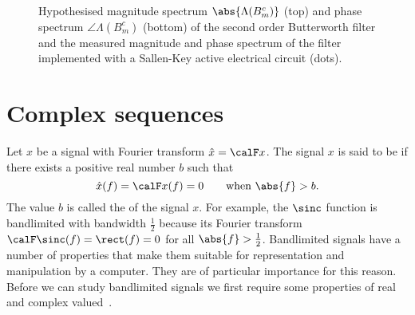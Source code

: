 \begin{figure}[p]
\centering
\begin{shaded}

\caption{Hypothesised magnitude spectrum $\abs{\Lambda(B_m^c)}$ (top) and phase spectrum $\angle{\Lambda(B_m^c)}$ (bottom) of the second order Butterworth filter and the measured magnitude and phase spectrum of the filter implemented with a Sallen-Key active electrical circuit (dots).}\label{fig:test:butterworthspectrum}
\end{shaded}
\end{figure}

\section{Complex sequences}

Let $x$ be a signal with Fourier transform $\hat{x} = \calF x$.  The signal $x$ is said to be  if there exists a positive real number $b$ such that 
\[
\hat{x}(f) = \calF x(f) = 0 \qquad \text{when $\abs{f} > b$}.
\]  
The value $b$ is called the  of the signal $x$.  For example, the $\sinc$ function is bandlimited with bandwidth $\tfrac{1}{2}$ because its Fourier transform $\calF \sinc(f) = \rect(f) = 0$ for all $\abs{f} > \tfrac{1}{2}$.
Bandlimited signals have a number of properties that make them suitable for representation and manipulation by a computer.  They are of particular importance for this reason.  Before we can study bandlimited signals we first require some properties of real and complex valued~.

